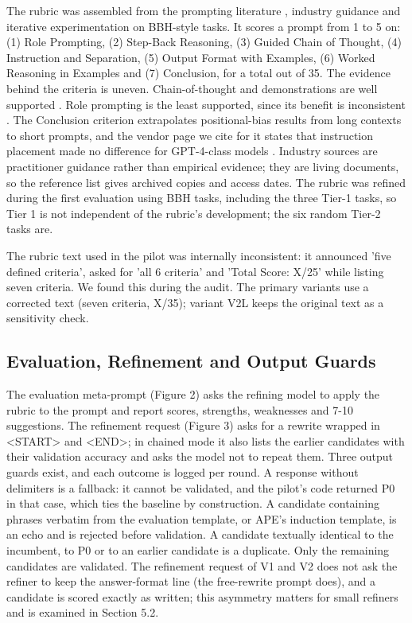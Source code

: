 \documentclass{ieeeaccess}
\begin{document}
The rubric was assembled from the prompting literature \cite{schulhoff2024,sahoo2024}, industry guidance \cite{boonstra2025,anthropic2025,openai2025,microsoft2025} and iterative experimentation on BBH-style tasks. It scores a prompt from 1 to 5 on: (1) Role Prompting, (2) Step-Back Reasoning, (3) Guided Chain of Thought, (4) Instruction and Separation, (5) Output Format with Examples, (6) Worked Reasoning in Examples and (7) Conclusion, for a total out of 35. The evidence behind the criteria is uneven. Chain-of-thought and demonstrations are well supported \cite{wei2022,wang2023,min2022}. Role prompting is the least supported, since its benefit is inconsistent \cite{kim2024,zheng2024b}. The Conclusion criterion extrapolates positional-bias results from long contexts \cite{liu2024,yu2025} to short prompts, and the vendor page we cite for it states that instruction placement made no difference for GPT-4-class models \cite{microsoft2025}. Industry sources are practitioner guidance rather than empirical evidence; they are living documents, so the reference list gives archived copies and access dates. The rubric was refined during the first evaluation using BBH tasks, including the three Tier-1 tasks, so Tier 1 is not independent of the rubric's development; the six random Tier-2 tasks are.

The rubric text used in the pilot was internally inconsistent: it announced 'five defined criteria', asked for 'all 6 criteria' and 'Total Score: X/25' while listing seven criteria. We found this during the audit. The primary variants use a corrected text (seven criteria, X/35); variant V2L keeps the original text as a sensitivity check.

\subsection{Evaluation, Refinement and Output Guards}

The evaluation meta-prompt (Figure 2) asks the refining model to apply the rubric to the prompt and report scores, strengths, weaknesses and 7-10 suggestions. The refinement request (Figure 3) asks for a rewrite wrapped in <START> and <END>; in chained mode it also lists the earlier candidates with their validation accuracy and asks the model not to repeat them. Three output guards exist, and each outcome is logged per round. A response without delimiters is a fallback: it cannot be validated, and the pilot's code returned P0 in that case, which ties the baseline by construction. A candidate containing phrases verbatim from the evaluation template, or APE's induction template, is an echo and is rejected before validation. A candidate textually identical to the incumbent, to P0 or to an earlier candidate is a duplicate. Only the remaining candidates are validated. The refinement request of V1 and V2 does not ask the refiner to keep the answer-format line (the free-rewrite prompt does), and a candidate is scored exactly as written; this asymmetry matters for small refiners and is examined in Section 5.2.
\end{document}

